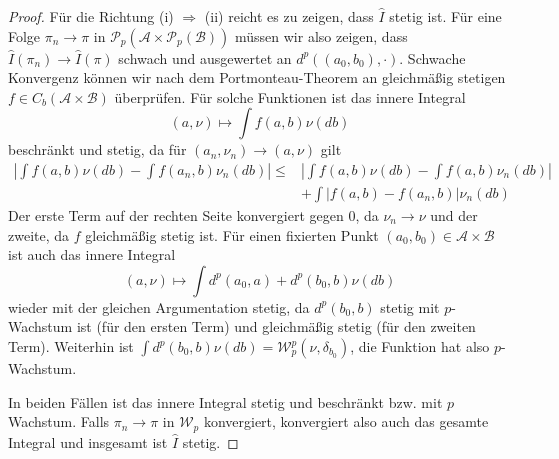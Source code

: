\begin{proof}
    Für die Richtung (i) $\Rightarrow$ (ii) reicht es zu zeigen, dass $\hat{I}$ stetig ist. Für eine Folge $\pi_n \rightarrow \pi$ in $\mathcal{P}_p(\mathcal{A} \times \mathcal{P}_p(\mathcal{B}))$ müssen wir also zeigen, dass $\hat{I}(\pi_n) \rightarrow \hat{I}(\pi)$ schwach und ausgewertet an $d^p((a_0, b_0), \cdot)$. Schwache Konvergenz können wir nach dem Portmonteau-Theorem an gleichmäßig stetigen $f \in C_b(\mathcal{A} \times \mathcal{B})$ überprüfen. Für solche Funktionen ist das innere Integral
    $$(a, \nu) \mapsto \int f(a, b) \nu(db)$$
    beschränkt und stetig, da für $(a_n, \nu_n) \rightarrow (a, \nu)$ gilt
    \begin{align*}
        \left| \int f(a,b) \nu(db) - \int f(a_n, b) \nu_n(db) \right| \leq  
        &\left|\int  f(a,b) \nu(db) - \int f(a,b) \nu_n(db) \right| \\
        &+\int \left|f(a, b) - f(a_n, b) \right|\nu_n(db)  
    \end{align*}
    Der erste Term auf der rechten Seite konvergiert gegen 0, da $\nu_n \rightarrow \nu$ und der zweite, da $f$ gleichmäßig stetig ist. Für einen fixierten Punkt $(a_0, b_0) \in \mathcal{A} \times \mathcal{B}$ ist auch das innere Integral
    $$ (a, \nu) \mapsto \int d^p(a_0, a) +d^p(b_0, b) \nu(db)$$
    wieder mit der gleichen Argumentation stetig, da $d^p(b_0, b)$ stetig mit $p$-Wachstum ist (für den ersten Term) und gleichmäßig stetig (für den zweiten Term). Weiterhin ist $\int d^p(b_0, b)\nu(db) = \mathcal{W}_p^p(\nu, \delta_{b_0})$, die Funktion hat also $p$-Wachstum.

    In beiden Fällen ist das innere Integral stetig und beschränkt bzw. mit $p$ Wachstum. Falls $\pi_n \rightarrow \pi$ in $\mathcal{W}_p$ konvergiert, konvergiert also auch das gesamte Integral und insgesamt ist $\hat{I}$ stetig.


\end{proof}
